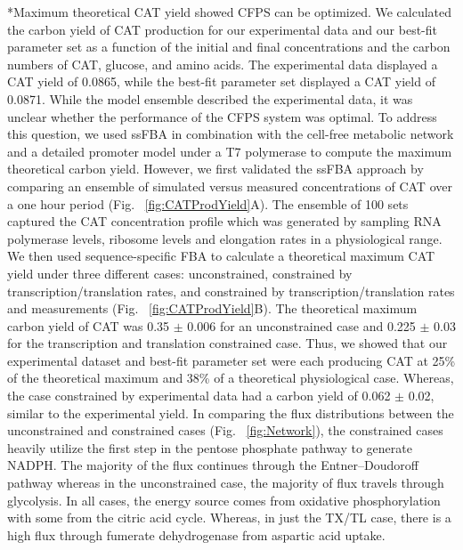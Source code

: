 \documentclass[12pt]{article}
\makeatletter
\renewcommand\subsection{\@startsection
	{subsection}{2}{0mm}
	{-0.05in}
	{-0.5\baselineskip}
	{\normalfont\normalsize\bfseries}}
\makeatother
\begin{document}
\subsection*{Maximum theoretical CAT yield showed CFPS can be optimized.}
We calculated the carbon yield of CAT production for our experimental data and our best-fit parameter set as a function of the initial and final concentrations and the carbon numbers of CAT, glucose, and amino acids.
The experimental data displayed a CAT yield of 0.0865, while the best-fit parameter set displayed a CAT yield of 0.0871.
While the model ensemble described the experimental data, it was unclear whether the performance of the CFPS system was optimal.
To address this question, we used ssFBA in combination with the cell-free metabolic network and a detailed promoter model under a T7 polymerase to compute the maximum theoretical carbon yield.
However, we first validated the ssFBA approach by comparing an ensemble of simulated versus measured concentrations of CAT over a one hour period (Fig. ~\ref{fig:CATProdYield}A). 
The ensemble of 100 sets captured the CAT concentration profile which was generated by sampling RNA polymerase levels, ribosome levels and elongation rates in a physiological range.
We then used sequence-specific FBA to calculate a theoretical maximum CAT yield under three different cases: unconstrained, constrained by transcription/translation rates, and constrained by transcription/translation rates and measurements (Fig. ~\ref{fig:CATProdYield}B).
The theoretical maximum carbon yield of CAT was 0.35 $\pm$ 0.006 for an unconstrained case and 0.225 $\pm$ 0.03 for the transcription and translation constrained case.
Thus, we showed that our experimental dataset and best-fit parameter set were each producing CAT at 25\% of the theoretical maximum and 38\% of a theoretical physiological case.
Whereas, the case constrained by experimental data had a carbon yield of 0.062 $\pm$ 0.02, similar to the experimental yield. 
In comparing the flux distributions between the unconstrained and constrained cases (Fig. ~\ref{fig:Network}), the constrained cases heavily utilize the first step in the pentose phosphate pathway to generate NADPH.
The majority of the flux continues through the Entner–Doudoroff pathway whereas in the unconstrained case, the majority of flux travels through glycolysis.
In all cases, the energy source comes from oxidative phosphorylation with some from the citric acid cycle.
Whereas, in just the TX/TL case, there is a high flux through fumerate dehydrogenase from aspartic acid uptake. 
\end{document}
